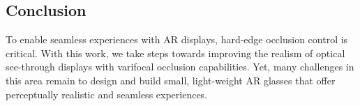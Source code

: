 \subsection{Conclusion}

To enable seamless experiences with AR displays, hard-edge occlusion control is critical. With this work, we take steps towards improving the realism of optical see-through displays with varifocal occlusion capabilities. Yet, many challenges in this area remain to design and build small, light-weight AR glasses that offer perceptually realistic and seamless experiences.


